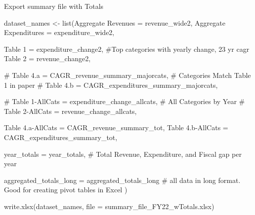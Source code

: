 \documentclass[
  letterpaper,
  DIV=11,
  numbers=noendperiod]{scrreport}
\newenvironment{Shaded}{\begin{snugshade}}{\end{snugshade}}
\newcommand{\AttributeTok}[1]{\textcolor[rgb]{0.40,0.45,0.13}{#1}}
\newcommand{\CommentTok}[1]{\textcolor[rgb]{0.37,0.37,0.37}{#1}}
\newcommand{\FunctionTok}[1]{\textcolor[rgb]{0.28,0.35,0.67}{#1}}
\newcommand{\NormalTok}[1]{\textcolor[rgb]{0.00,0.23,0.31}{#1}}
\newcommand{\OtherTok}[1]{\textcolor[rgb]{0.00,0.23,0.31}{#1}}
\newcommand{\StringTok}[1]{\textcolor[rgb]{0.13,0.47,0.30}{#1}}
\begin{document}
Export summary file with Totals

\begin{Shaded}
\begin{Highlighting}[]
\NormalTok{dataset\_names }\OtherTok{\textless{}{-}} \FunctionTok{list}\NormalTok{(}\StringTok{\textquotesingle{}Aggregate Revenues\textquotesingle{}} \OtherTok{=}\NormalTok{ revenue\_wide2, }
                      \StringTok{\textquotesingle{}Aggregate Expenditures\textquotesingle{}} \OtherTok{=}\NormalTok{ expenditure\_wide2, }

                      
                      \StringTok{\textquotesingle{}Table 1\textquotesingle{}} \OtherTok{=}\NormalTok{ expenditure\_change2, }\CommentTok{\#Top categories with yearly change, 23 yr cagr}
                      \StringTok{\textquotesingle{}Table 2\textquotesingle{}} \OtherTok{=}\NormalTok{ revenue\_change2,}
                      
                     \CommentTok{\# \textquotesingle{}Table 4.a\textquotesingle{} = CAGR\_revenue\_summary\_majorcats, \# Categories Match Table 1 in paper}
                     \CommentTok{\# \textquotesingle{}Table 4.b\textquotesingle{} = CAGR\_expenditures\_summary\_majorcats, }
                                            
                     \CommentTok{\# \textquotesingle{}Table 1{-}AllCats\textquotesingle{} = expenditure\_change\_allcats,  \# All Categories by Year}
                    \CommentTok{\#  \textquotesingle{}Table 2{-}AllCats\textquotesingle{} = revenue\_change\_allcats,}
                      
                      \StringTok{\textquotesingle{}Table 4.a{-}AllCats\textquotesingle{}} \OtherTok{=}\NormalTok{ CAGR\_revenue\_summary\_tot, }
                      \StringTok{\textquotesingle{}Table 4.b{-}AllCats\textquotesingle{}} \OtherTok{=}\NormalTok{ CAGR\_expenditures\_summary\_tot, }
                      
                      \StringTok{\textquotesingle{}year\_totals\textquotesingle{}} \OtherTok{=}\NormalTok{ year\_totals,    }\CommentTok{\# Total Revenue, Expenditure, and Fiscal gap per year}
                      
                      \StringTok{\textquotesingle{}aggregated\_totals\_long\textquotesingle{}} \OtherTok{=}\NormalTok{ aggregated\_totals\_long }\CommentTok{\# all data in long format. Good for creating pivot tables in Excel}
\NormalTok{                      )}

\FunctionTok{write.xlsx}\NormalTok{(dataset\_names, }\AttributeTok{file =} \StringTok{\textquotesingle{}summary\_file\_FY22\_wTotals.xlsx\textquotesingle{}}\NormalTok{)}
\end{Highlighting}
\end{Shaded}
\end{document}
